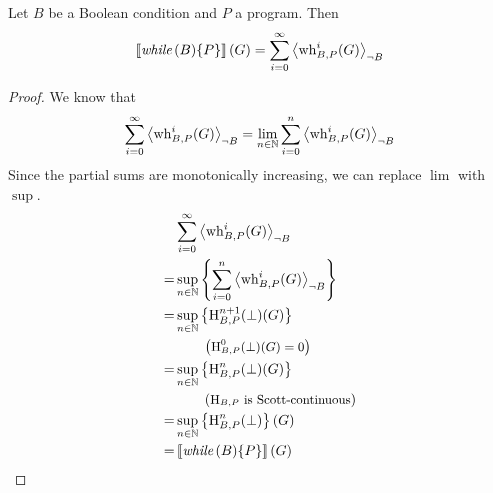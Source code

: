 \begin{theorem}[continues=theo:ext:whilesmtx]
	Let $B$ be a Boolean condition and $P$ a program.
	Then \[ \smtx{\while{B}{P}}(G) = \sum_{i = 0}^{\infty} \resN{\wh^i(G)} \]
	
	\begin{proof}
		We know that
		\[ \infsum \resN{\wh^i(G)} = \lim_{n \in \N} \sum_{i=0}^{n} \resN{\wh^i(G)} \]
		Since the partial sums are monotonically increasing, we can replace $\lim$ with $\sup$.
		\begin{align*}
			 & \infsum \resN{\wh^i(G)} \\
			=& \sup_{n \in \N} \l\{ \sum_{i=0}^{n} \resN{\wh^i(G)} \r\} \\
			=& \sup_{n \in \N} \l\{ \hh^{n+1}(\bot)(G) \r\} \\
			 & \explain{$\hh^0(\bot)(G) = 0$} \\
			=& \sup_{n \in \N} \l\{ \hh^{n}(\bot)(G) \r\} \\
			 & \explain{$\hh$ is Scott-continuous} \\
			=& \sup_{n \in \N} \l\{ \hh^{n}(\bot) \r\}(G) \\
			=& \smtx{\while{B}{P}}(G)			\qedhere
			\end{align*}
	\end{proof}
\end{theorem}